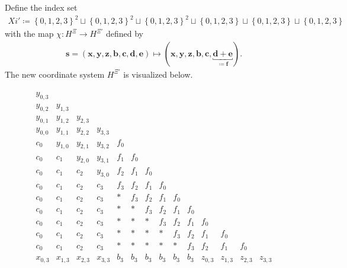 \begin{definition}
    Define the index set 
    \begin{align*}
        Xi' \coloneqq \left\{ 0,1,2,3 \right\}^2 \sqcup \left\{ 0,1,2,3 \right\}^2 \sqcup \left\{ 0,1,2,3 \right\}^2 \sqcup \left\{ 0,1,2,3 \right\} \sqcup \left\{ 0,1,2,3 \right\} \sqcup \left\{ 0,1,2,3 \right\} 
    \end{align*}
    with the map \( \chi: H^\Xi \to H^{\Xi'}\) defined by 
    \begin{align*}
        \mathbf{s} = (\mathbf{x}, \mathbf{y}, \mathbf{z}, \mathbf{b}, \mathbf{c}, \mathbf{d}, \mathbf{e}) \mapsto (\mathbf{x}, \mathbf{y}, \mathbf{z}, \mathbf{b}, \mathbf{c}, \underbracket{\mathbf{d} + \mathbf{e}}_{\coloneqq \mathbf{f}}).
    \end{align*}
    The new coordinate system \( H^{\Xi'} \) is visualized below.
\begin{figure}[H]
    \begin{align*}
        \begin{array}{cccccccccccccccccccc}
            y_{0,3} & & & & & & & & & & & & \\
            y_{0,2} & y_{1,3} & & & & & & & & & & & \\
            y_{0,1} & y_{1,2} & y_{2,3} & & & & & & & & & & \\
            y_{0,0} & y_{1,1} & y_{2,2} & y_{3,3} & & & & & & & & & \\
            c_0 & y_{1,0} & y_{2,1} & y_{3,2} & f_0 & & & & & & & & \\
            c_0 & c_1 & y_{2,0} & y_{3,1} & f_1 & f_0 & & & & & & & \\
            c_0 & c_1 & c_2 & y_{3,0} & f_2 & f_1 & f_0 & & & & & & \\
            c_0 & c_1 & c_2 & c_3 & f_3 & f_2 & f_1 & f_0 & & & & & \\
            c_0 & c_1 & c_2 & c_3 &  *  & f_3 & f_2 & f_1 & f_0 & & & & \\
            c_0 & c_1 & c_2 & c_3 &  *  & * & f_3 & f_2 & f_1 & f_0 & & & \\
            c_0 & c_1 & c_2 & c_3 &  *  & * & * & f_3 & f_2 & f_1 & f_0 & & \\
            c_0 & c_1 & c_2 & c_3 &  *  & * & * & * & f_3 & f_2 & f_1 & f_0 & \\
            c_0 & c_1 & c_2 & c_3 &  *  & * & * & * & * & f_3 & f_2 & f_1 & f_0 \\
            x_{0,3} & x_{1,3} & x_{2,3} & x_{3,3} & b_3 & b_3 & b_3 & b_3 & b_3 & b_3 & z_{0,3} & z_{1,3} & z_{2,3} & z_{3,3} \\

\end{array}
\end{align*}
\end{figure}
\end{definition}
